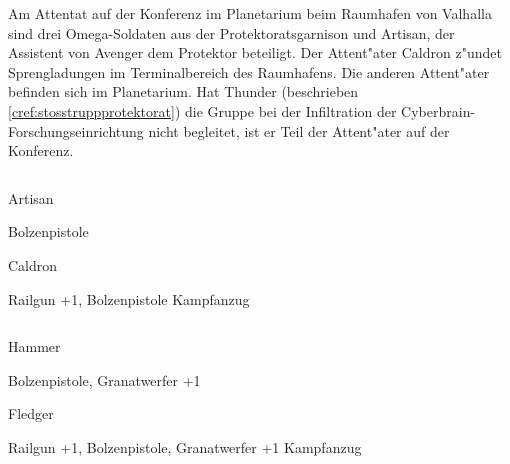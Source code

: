 
Am Attentat auf der Konferenz im Planetarium beim Raumhafen von Valhalla sind drei Omega-Soldaten aus der Protektoratsgarnison und Artisan, der Assistent von Avenger dem Protektor beteiligt. Der Attent"ater Caldron z"undet Sprengladungen im Terminalbereich des Raumhafens. Die anderen Attent"ater befinden sich im Planetarium. Hat Thunder (beschrieben \cref{cref:stosstruppprotektorat}) die Gruppe bei der Infiltration der Cyberbrain-Forschungseinrichtung nicht begleitet, ist er Teil der Attent"ater auf der Konferenz.

\begin{column}[l]{0.45}
    \begin{nscsheet}[h]{Artisan}
        \nscstats[ATT=2,AGG=2,DEX=2,COM=3]
        \nscruler
        \begin{nscinventory}
            \nscitem[Waffen] Bolzenpistole
        \end{nscinventory}
    \end{nscsheet}

    \begin{nscsheet}[h]{Caldron}
        \nscstats[ATT=2,AGG=3,CON=2]
        \nscruler
        \begin{nscinventory}
            \nscitem[Waffen] Railgun +1, Bolzenpistole
            \nscitem[R"ustung] Kampfanzug
        \end{nscinventory}
    \end{nscsheet}
\end{column}
\begin{column}[r]{0.45}
    \begin{nscsheet}[h]{Hammer}
        \nscstats[ATT=2,AGG=3,CON=2]
        \nscruler
        \begin{nscinventory}
            \nscitem[Waffen] Bolzenpistole, Granatwerfer +1            
        \end{nscinventory}
    \end{nscsheet}

    \begin{nscsheet}[h]{Fledger}
        \nscstats[ATT=2,AGG=3,CON=2]
        \nscruler
        \begin{nscinventory}
            \nscitem[Waffen] Railgun +1, Bolzenpistole, Granatwerfer +1
            \nscitem[R"ustung] Kampfanzug
        \end{nscinventory}
    \end{nscsheet}            
\end{column}

